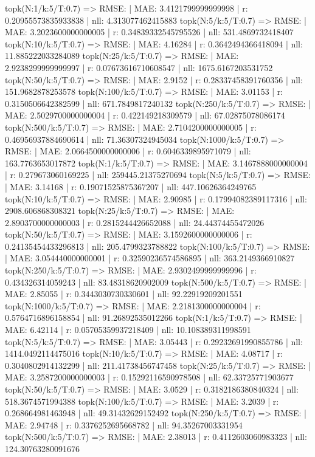 topk(N:1/k:5/T:0.7) => RMSE: | MAE: 3.4121799999999998 | r: 0.20955573835933838 | nll: 4.313077462415883
topk(N:5/k:5/T:0.7) => RMSE: | MAE: 3.2023600000000005 | r: 0.34839332545795526 | nll: 531.4869732418407
topk(N:10/k:5/T:0.7) => RMSE: | MAE: 4.16284 | r: 0.3642494366418094 | nll: 11.885222033284089
topk(N:25/k:5/T:0.7) => RMSE: | MAE: 2.9238299999999997 | r: 0.07673616710608547 | nll: 1675.6167203531752
topk(N:50/k:5/T:0.7) => RMSE: | MAE: 2.9152 | r: 0.28337458391760356 | nll: 151.9682878253578
topk(N:100/k:5/T:0.7) => RMSE: | MAE: 3.01153 | r: 0.3150506642382599 | nll: 671.7849817240132
topk(N:250/k:5/T:0.7) => RMSE: | MAE: 2.5029700000000004 | r: 0.422149218309579 | nll: 67.02875078086174
topk(N:500/k:5/T:0.7) => RMSE: | MAE: 2.7104200000000005 | r: 0.46956937884690614 | nll: 71.36307324945034
topk(N:1000/k:5/T:0.7) => RMSE: | MAE: 2.0664500000000006 | r: 0.6046339895971079 | nll: 163.7763653017872
topk(N:1/k:5/T:0.7) => RMSE: | MAE: 3.1467888000000004 | r: 0.279673060169225 | nll: 259445.21375270694
topk(N:5/k:5/T:0.7) => RMSE: | MAE: 3.14168 | r: 0.19071525875367207 | nll: 447.10626364249765
topk(N:10/k:5/T:0.7) => RMSE: | MAE: 2.90985 | r: 0.17994082389117316 | nll: 2908.606868308321
topk(N:25/k:5/T:0.7) => RMSE: | MAE: 2.8903700000000003 | r: 0.2815244426652088 | nll: 24.44374455472026
topk(N:50/k:5/T:0.7) => RMSE: | MAE: 3.1592600000000006 | r: 0.24135454433296813 | nll: 205.4799323788822
topk(N:100/k:5/T:0.7) => RMSE: | MAE: 3.054440000000001 | r: 0.32590236574586895 | nll: 363.2149366910827
topk(N:250/k:5/T:0.7) => RMSE: | MAE: 2.9302499999999996 | r: 0.434326314059243 | nll: 83.48318620902009
topk(N:500/k:5/T:0.7) => RMSE: | MAE: 2.85055 | r: 0.3443030730330601 | nll: 92.22919209201551
topk(N:1000/k:5/T:0.7) => RMSE: | MAE: 2.2181300000000004 | r: 0.5764716896158854 | nll: 91.26892535012266
topk(N:1/k:5/T:0.7) => RMSE: | MAE: 6.42114 | r: 0.05705359937218409 | nll: 10.108389311998591
topk(N:5/k:5/T:0.7) => RMSE: | MAE: 3.05443 | r: 0.29232691990855786 | nll: 1414.0492114475016
topk(N:10/k:5/T:0.7) => RMSE: | MAE: 4.08717 | r: 0.3040802914132299 | nll: 211.41738456747458
topk(N:25/k:5/T:0.7) => RMSE: | MAE: 3.2587200000000003 | r: 0.15292116590978508 | nll: 62.33725771903677
topk(N:50/k:5/T:0.7) => RMSE: | MAE: 3.0529 | r: 0.3182186380840324 | nll: 518.3674571994388
topk(N:100/k:5/T:0.7) => RMSE: | MAE: 3.2039 | r: 0.268664981463948 | nll: 49.31432629152492
topk(N:250/k:5/T:0.7) => RMSE: | MAE: 2.94748 | r: 0.3376252695668782 | nll: 94.35267003331954
topk(N:500/k:5/T:0.7) => RMSE: | MAE: 2.38013 | r: 0.4112603060983323 | nll: 124.30763280091676

